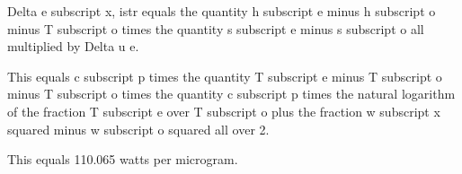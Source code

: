 Delta e subscript x, istr equals the quantity h subscript e minus h subscript o minus T subscript o times the quantity s subscript e minus s subscript o all multiplied by Delta u e.

This equals c subscript p times the quantity T subscript e minus T subscript o minus T subscript o times the quantity c subscript p times the natural logarithm of the fraction T subscript e over T subscript o plus the fraction w subscript x squared minus w subscript o squared all over 2.

This equals 110.065 watts per microgram.